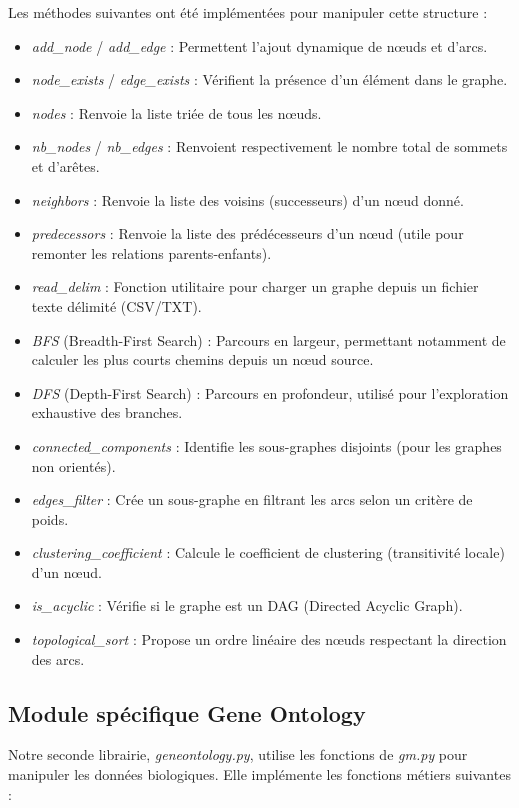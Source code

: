 \documentclass[12pt,a4paper]{article}
\begin{document}
Les méthodes suivantes ont été implémentées pour manipuler cette structure :
\begin{itemize}
    \item \textit{add\_node} / \textit{add\_edge} : Permettent l'ajout dynamique de nœuds et d'arcs.
    \item \textit{node\_exists} / \textit{edge\_exists} : Vérifient la présence d'un élément dans le graphe.
    \item \textit{nodes} : Renvoie la liste triée de tous les nœuds.
    \item \textit{nb\_nodes} / \textit{nb\_edges} : Renvoient respectivement le nombre total de sommets et d'arêtes.
    \item \textit{neighbors} : Renvoie la liste des voisins (successeurs) d'un nœud donné.
    \item \textit{predecessors} : Renvoie la liste des prédécesseurs d'un nœud (utile pour remonter les relations parents-enfants).
    \item \textit{read\_delim} : Fonction utilitaire pour charger un graphe depuis un fichier texte délimité (CSV/TXT).
    \item \textit{BFS} (Breadth-First Search) : Parcours en largeur, permettant notamment de calculer les plus courts chemins depuis un nœud source.
    \item \textit{DFS} (Depth-First Search) : Parcours en profondeur, utilisé pour l'exploration exhaustive des branches.
    \item \textit{connected\_components} : Identifie les sous-graphes disjoints (pour les graphes non orientés).
    \item \textit{edges\_filter} : Crée un sous-graphe en filtrant les arcs selon un critère de poids.
    \item \textit{clustering\_coefficient} : Calcule le coefficient de clustering (transitivité locale) d'un nœud.
    \item \textit{is\_acyclic} : Vérifie si le graphe est un DAG (Directed Acyclic Graph).
    \item \textit{topological\_sort} : Propose un ordre linéaire des nœuds respectant la direction des arcs.
\end{itemize}

\subsection{Module spécifique Gene Ontology}
Notre seconde librairie, \textit{geneontology.py}, utilise les fonctions de \textit{gm.py} pour manipuler les données biologiques. Elle implémente les fonctions métiers suivantes :
\end{document}
